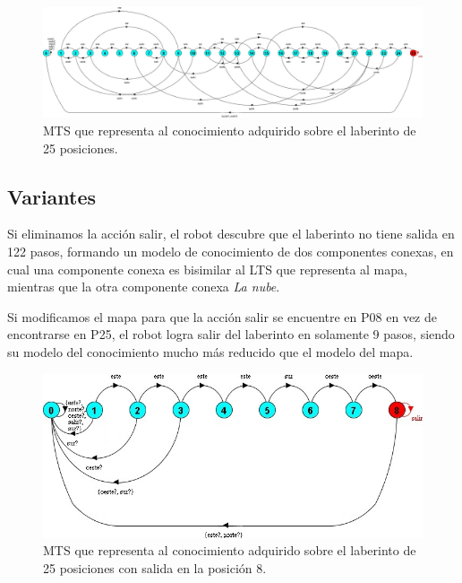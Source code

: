 \begin{figure}[H]
	\centering
		\includegraphics[width=1.0\textwidth]{Imagenes/Laberintos/25_knowledge.jpg}
	\caption{MTS que representa al conocimiento adquirido sobre el laberinto de 25 posiciones.}
	\label{fig:25_knowledge}
\end{figure}

\clearpage

\subsection{Variantes}

Si eliminamos la acción salir, el robot descubre que el laberinto no tiene salida en 122 pasos, formando un modelo 
de conocimiento de dos componentes conexas, en cual una componente conexa es bisimilar al LTS que representa al mapa, 
mientras que la otra componente conexa \textit{La nube}.

\vspace{\baselineskip}
Si modificamos el mapa para que la acción salir se encuentre en \textcolor[HTML]{0000A0}{P08} en vez de encontrarse 
en \textcolor[HTML]{0000A0}{P25}, el robot logra salir del laberinto en solamente 9 pasos, siendo su modelo del conocimiento 
mucho más reducido que el modelo del mapa.

\begin{figure}[H]
	\centering
		\includegraphics[width=1.0\textwidth]{Imagenes/Laberintos/25_knowledge_alternativo.jpg}
	\caption{MTS que representa al conocimiento adquirido sobre el laberinto de 25 posiciones con salida en la posición 8.}
	\label{fig:25_knowledge_alternativo}
\end{figure}

